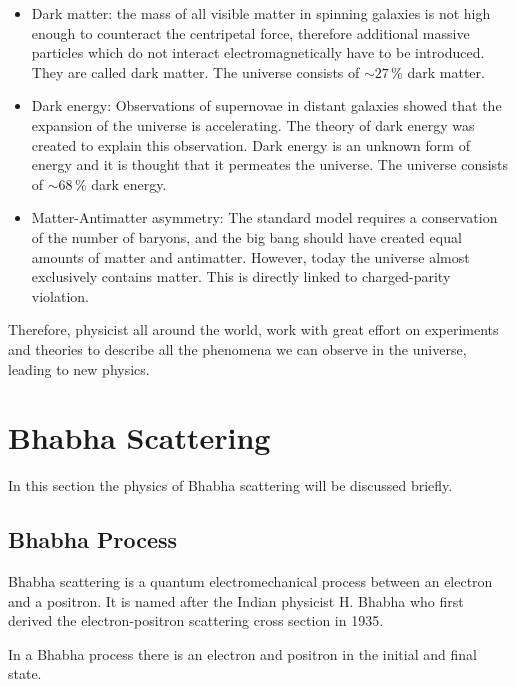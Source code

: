 \documentclass[a4paper,11pt,twosided,final,german,openbib,pdftex,listof=totoc,bibliography=totoc]{scrbook}
\begin{document}
\begin{itemize}
	
\item Dark matter: the mass of all visible matter in spinning galaxies is not high enough to counteract the centripetal force, therefore additional massive particles which do not interact electromagnetically have to be introduced. They are called dark matter. The universe consists of $\sim 27\,\%$ dark matter.\cite{DarkMAtter}


\item Dark energy: Observations of supernovae in distant galaxies showed that the expansion of the universe is accelerating. The theory of dark energy was created to explain this observation. Dark energy is an unknown form of energy and it is thought that it permeates the universe. The universe consists of $\sim 68\,\%$ dark energy.\cite{Janka}


\item  Matter-Antimatter asymmetry: The standard model requires a conservation of the number of baryons, and the big bang should have created equal amounts of matter and antimatter. However, today the universe almost exclusively contains matter. This is directly linked to charged-parity violation.\cite{HAMBYE2012193}


\end{itemize}

Therefore, physicist all around the world, work with great effort on experiments and theories to describe all the phenomena we can observe in the universe, leading to new physics.

\section{Bhabha Scattering}
\label{sec:Bhabha}

In this section the physics of Bhabha scattering will be discussed briefly.
 
\subsection{Bhabha Process}
 \label{sec:BhabhaProcess}
 Bhabha scattering is a quantum electromechanical process between an electron and a positron. It is named after the Indian  physicist H. Bhabha who first derived the electron-positron scattering cross section in 1935.\cite{Bhabha}
 
In a Bhabha process there is an electron and positron in the initial and final state. 
\end{document}
